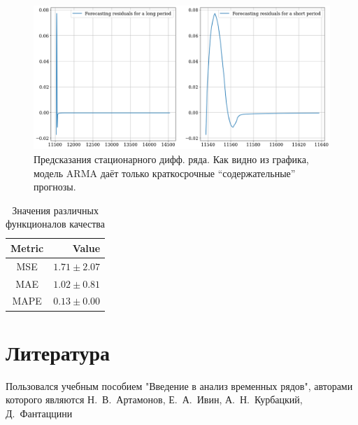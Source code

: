 \documentclass[a4paper,14pt]{article}
\theoremstyle{plain} %
\theoremstyle{definition} %
\theoremstyle{remark} %
\begin{document}
	\begin{figure}[bhtp]
		\centering
		\includegraphics[width=\linewidth]{resid_pred.png}
		\caption{Предсказания стационарного дифф. ряда. Как видно из графика, модель ARMA даёт только краткосрочные “содержательные” прогнозы.}
	\end{figure}

	\renewcommand{\arraystretch}{1.5}
	\begin{table}[bhtp]
		\centering
		\caption{Значения различных функционалов качества}
		\begin{tabular}{|c|c|}
			\hline
			\textbf{Metric} & \multicolumn{1}{r|}{\textbf{Value}} \\ \hline
			MSE & $1.71 \pm 2.07$ \\ \hline
			MAE & $1.02 \pm 0.81$ \\ \hline
			MAPE & $0.13 \pm 0.00$ \\ \hline
		\end{tabular}
	\end{table}

	\section{Литература}
	Пользовался учебным пособием "Введение в анализ временных рядов", авторами которого являются Н.~В.~Артамонов, Е.~А.~Ивин, А.~Н.~Курбацкий, Д.~Фантаццини
\end{document}
